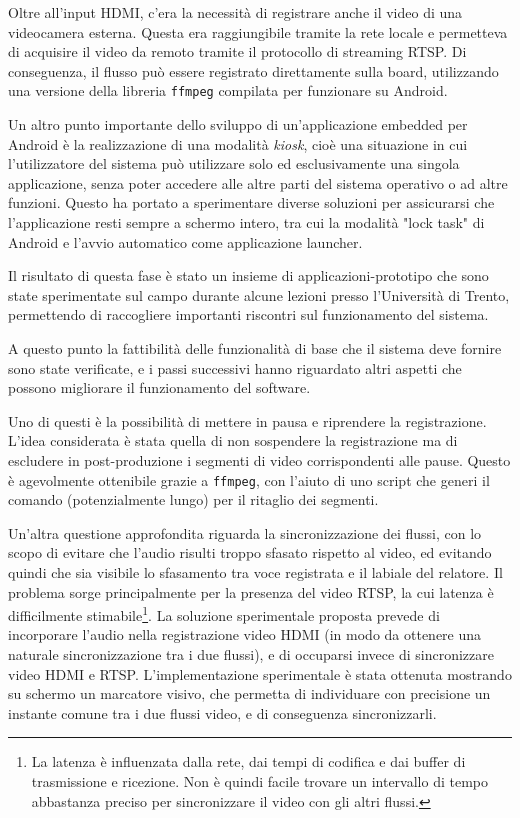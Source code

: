 Oltre all'input HDMI, c'era la necessità di registrare anche il video di una videocamera esterna. Questa era raggiungibile tramite la rete locale e permetteva di acquisire il video da remoto tramite il protocollo di streaming RTSP. Di conseguenza, il flusso può essere registrato direttamente sulla board, utilizzando una versione della libreria \texttt{ffmpeg} compilata per funzionare su Android.

Un altro punto importante dello sviluppo di un'applicazione embedded per Android è la realizzazione di una modalità \textit{kiosk}, cioè una situazione in cui l'utilizzatore del sistema può utilizzare solo ed esclusivamente una singola applicazione, senza poter accedere alle altre parti del sistema operativo o ad altre funzioni. Questo ha portato a sperimentare diverse soluzioni per assicurarsi che l'applicazione resti sempre a schermo intero, tra cui la modalità "lock task" di Android e l'avvio automatico come applicazione launcher.

Il risultato di questa fase è stato un insieme di applicazioni-prototipo che sono state sperimentate sul campo durante alcune lezioni presso l'Università di Trento, permettendo di raccogliere importanti riscontri sul funzionamento del sistema.

A questo punto la fattibilità delle funzionalità di base che il sistema deve fornire sono state verificate, e i passi successivi hanno riguardato altri aspetti che possono migliorare il funzionamento del software.

Uno di questi è la possibilità di mettere in pausa e riprendere la registrazione. L'idea considerata è stata quella di non sospendere la registrazione ma di escludere in post-produzione i segmenti di video corrispondenti alle pause. Questo è agevolmente ottenibile grazie a \texttt{ffmpeg}, con l'aiuto di uno script che generi il comando (potenzialmente lungo) per il ritaglio dei segmenti.

Un'altra questione approfondita riguarda la sincronizzazione dei flussi, con lo scopo di evitare che l'audio risulti troppo sfasato rispetto al video, ed evitando quindi che sia visibile lo sfasamento tra voce registrata e il labiale del relatore. Il problema sorge principalmente per la presenza del video RTSP, la cui latenza è difficilmente stimabile\footnote{La latenza è influenzata dalla rete, dai tempi di codifica e dai buffer di trasmissione e ricezione. Non è quindi facile trovare un intervallo di tempo abbastanza preciso per sincronizzare il video con gli altri flussi.}. La soluzione sperimentale proposta prevede di incorporare l'audio nella registrazione video HDMI (in modo da ottenere una naturale sincronizzazione tra i due flussi), e di occuparsi invece di sincronizzare video HDMI e RTSP. L'implementazione sperimentale è stata ottenuta mostrando su schermo un marcatore visivo, che permetta di individuare con precisione un instante comune tra i due flussi video, e di conseguenza sincronizzarli.

